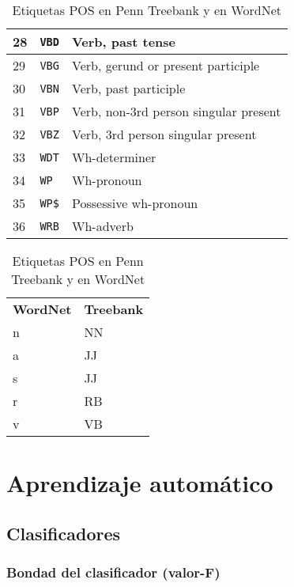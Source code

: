 \begin{table}[htbp]
\begin{subtable}[t]{0.60\linewidth}
\begin{tabular}{|l|l|l|}
28 & \verb=VBD= & Verb, past tense \\ \hline
29 & \verb=VBG= & Verb, gerund or present participle \\ \hline
30 & \verb=VBN= & Verb, past participle \\ \hline
31 & \verb=VBP= & Verb, non-3rd person singular present \\ \hline
32 & \verb=VBZ= & Verb, 3rd person singular present \\ \hline
33 & \verb=WDT= & Wh-determiner \\ \hline
34 & \verb=WP= & Wh-pronoun \\ \hline
35 & \verb=WP$= & Possessive wh-pronoun \\ \hline
36 & \verb=WRB= & Wh-adverb \\ \hline
\end{tabular}
\caption{POS tags del Penn Treebank}
\label{tbl:pos-tags-peen-treebank}
\end{subtable}
\begin{subtable}{0.38\linewidth}
\centering
\begin{tabular}{|l|l|}
\hline
\textbf{WordNet} & \textbf{Treebank} \\ \hhline{==}
n & NN \\ \hline
a & JJ \\ \hline
s & JJ \\ \hline
r & RB \\ \hline
v & VB \\ \hline
\end{tabular}
\caption{POS tags correspondientes en WordNet}
\label{tbl:pos-tags-wordnet}
\end{subtable}
\caption{Etiquetas POS en Penn Treebank y en WordNet}
\label{tbl:pos-tags}
\end{table}

\chapter{Aprendizaje automático}

\section{Clasificadores}

\subsection{Bondad del clasificador (valor-F)}

